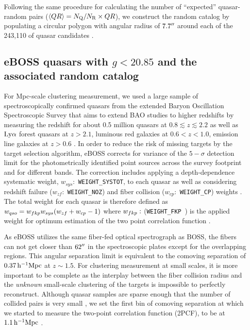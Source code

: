 \documentclass[useAMS,usenatbib]{mn2e}
\begin{document}
Following the same procedure for calculating the number of ``expected'' quasar-random pairs ($\langle QR \rangle = N_{\rm Q}/N_{\rm R} \times QR$), we construct the random catalog by populating a circular polygon with angular radius of $7.7\arcsec$ around each of the 243{,}110 of quasar candidates \citep[see section 3.1 of][for a detailed description of the taken steps for constructing the random catalog]{ef17}. 


\subsection{eBOSS quasars with $g<20.85$ and the associated random catalog}\label{ldat}

For Mpc-scale clustering measurement, we used a large sample of spectroscopically confirmed quasars from the extended Baryon Oscillation Spectroscopic Survey \citep[eBOSS;][]{daw16} that aims to extend BAO studies to higher redshifts by measuring the redshift for about 0.5 million quasars at $0.8\lesssim z \lesssim 2.2$ as well as $\rm Ly\alpha$ forest quasars at $z>2.1$, luminous red galaxies at $0.6<z<1.0$, emission line galaxies at $z>0.6$ \citep[see ][for target selection criteria and process]{my15}. In order to reduce the risk of missing targets by the target selection algorithm, eBOSS corrects for variance of the $5-\sigma$ detection limit for the photometrically identified point sources across the survey footprint and for different bands. The correction includes applying a depth-dependence systematic weight, $w_{sys}:$ {\tt WEIGHT\_SYSTOT}, to each quasar as well as considering redshift failure ($w_{zf}:$ {\tt WEIGHT\_NOZ}) and fiber collision ($w_{cp}:$ {\tt WEIGHT\_CP}) weights \citep[see, ][for detail of the weight determination]{la17,rod17,bp17,an12,ross12}. The total weight for each quasar is therefore defined as $w_{qso} = w_{\sc fkp}w_{sys}(w_{zf}+w_{cp}-1)$ where $w_{\sc fkp}:$ ({\tt WEIGHT\_FKP  }) is the applied weight for optimum estimation of the two point correlation function \citep[see, ][]{fkp94}.


As eBOSS utilizes the same fiber-fed optical spectrograph as BOSS, the fibers can not get closer than $62 \arcsec$ in the spectroscopic plates except for the overlapping regions\citep{bl03}. This angular separation limit is equivalent to the comoving separation of $0.37\, \rm h^{-1}Mpc$ at $z\sim 1.5$. For clustering measurement at small scales, it is more important to be complete as the interplay between the fiber collision radius and the {\it unknown} small-scale clustering of the targets is impossible to perfectly reconstruct. Although quasar samples are sparse enough that the number of collided pairs is very small \citep[e.g.,][]{rod17}, we set the first bin of comoving separation at which we started to measure the two-point correlation function (2PCF), to be at $1.1 \, \rm h^{-1}Mpc$ \citep[see, e. g., ][for studies on the efficiency of fiber collision corrections at small scales]{gu12,ha17}. 
\end{document}
